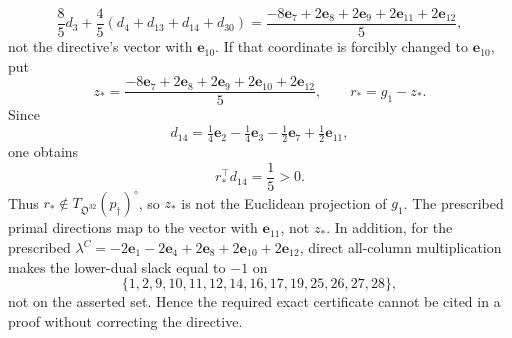 \[
\frac85d_3+\frac45(d_4+d_{13}+d_{14}+d_{30})
=\frac{-8\mathbf e_7+2\mathbf e_8+2\mathbf e_9+2\mathbf e_{11}+2\mathbf e_{12}}5,
\]
not the directive's vector with \(\mathbf e_{10}\).  If that coordinate is forcibly changed to \(\mathbf e_{10}\), put
\[
z_*=\frac{-8\mathbf e_7+2\mathbf e_8+2\mathbf e_9+2\mathbf e_{10}+2\mathbf e_{12}}5,
\qquad r_*=g_1-z_*.
\]
Since
\[
d_{14}=\tfrac14\mathbf e_2-\tfrac14\mathbf e_3-\tfrac12\mathbf e_7+\tfrac12\mathbf e_{11},
\]
one obtains
\[
r_*^{\top}d_{14}=\frac15>0.
\]
Thus \(r_*\notin T_{\mathfrak O^{32}}(p_\dagger)^\circ\), so \(z_*\) is not the Euclidean projection of \(g_1\).  The prescribed primal directions map to the vector with \(\mathbf e_{11}\), not \(z_*\).  In addition, for the prescribed \(\lambda^C=-2\mathbf e_1-2\mathbf e_4+2\mathbf e_8+2\mathbf e_{10}+2\mathbf e_{12}\), direct all-column multiplication makes the lower-dual slack equal to \(-1\) on
\[
\{1,2,9,10,11,12,14,16,17,19,25,26,27,28\},
\]
not on the asserted set.  Hence the required exact certificate cannot be cited in a proof without correcting the directive.